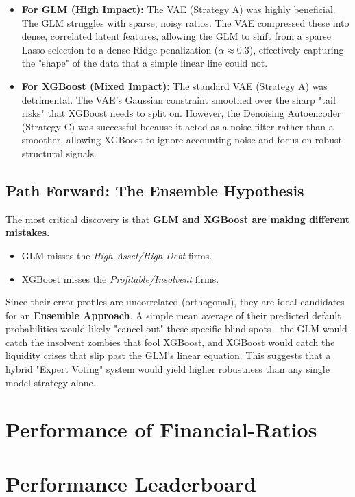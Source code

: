 \documentclass{report}\usepackage[]{graphicx}\usepackage[]{xcolor}
\begin{document}
\begin{itemize}
    \item \textbf{For GLM (High Impact):} The VAE (Strategy A) was highly beneficial. The GLM struggles with sparse, noisy ratios. The VAE compressed these into dense, correlated latent features, allowing the GLM to shift from a sparse Lasso selection to a dense Ridge penalization ($\alpha \approx 0.3$), effectively capturing the "shape" of the data that a simple linear line could not.
    \item \textbf{For XGBoost (Mixed Impact):} The standard VAE (Strategy A) was detrimental. The VAE's Gaussian constraint smoothed over the sharp "tail risks" that XGBoost needs to split on. However, the Denoising Autoencoder (Strategy C) was successful because it acted as a noise filter rather than a smoother, allowing XGBoost to ignore accounting noise and focus on robust structural signals.
\end{itemize}

\subsection{Path Forward: The Ensemble Hypothesis}

The most critical discovery is that \textbf{GLM and XGBoost are making different mistakes.}
\begin{itemize}
    \item GLM misses the \textit{High Asset/High Debt} firms.
    \item XGBoost misses the \textit{Profitable/Insolvent} firms.
\end{itemize}

Since their error profiles are uncorrelated (orthogonal), they are ideal candidates for an \textbf{Ensemble Approach}. A simple mean average of their predicted default probabilities would likely "cancel out" these specific blind spots—the GLM would catch the insolvent zombies that fool XGBoost, and XGBoost would catch the liquidity crises that slip past the GLM's linear equation. This suggests that a hybrid "Expert Voting" system would yield higher robustness than any single model strategy alone.

\section{Performance of Financial-Ratios}




\section{Performance Leaderboard}
\end{document}

